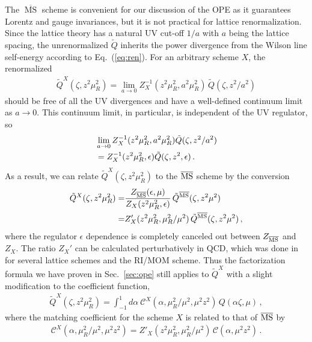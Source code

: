 The $\overline{\ensuremath{\operatorname{MS}}}$ scheme is convenient for our discussion of the OPE as it guarantees Lorentz and gauge invariances, but it is not practical for lattice renormalization. Since the lattice theory has a natural UV cut-off $1/a$ with $a$ being the lattice spacing, the unrenormalized \spcorr $\tilde{Q}$ inherits the power divergence from the Wilson line self-energy according to Eq.~(\ref{eq:ren}). For an arbitrary scheme $X$, the renormalized \spcorr
\begin{align}
\tilde{Q}^X(\zeta,z^2\mu^2_R)
  = \lim_{a\to0} Z^{-1}_X(z^2\mu_R^2,a^2\mu^2_R)\, \tilde{Q}(\zeta,z^2/a^2)
\end{align}
should be free of all the UV divergences and have a well-defined continuum limit as $a\to0$. This continuum limit, in particular, is independent of the UV regulator, so
\begin{align}
&\lim_{a\to0} Z^{-1}_X(z^2\mu_R^2,a^2\mu^2_R)\tilde{Q}(\zeta,z^2/a^2) \nonumber\\
&= Z^{-1}_X(z^2\mu^2_R,\epsilon)\tilde{Q}(\zeta,z^2,\epsilon)\,.
\end{align}
As a result, we can relate $\tilde{Q}^X(\zeta,z^2\mu^2_R)$ to the $\overline{\rm MS}$ scheme by the conversion
\begin{align}
\tilde{Q}^X(\zeta,z^2\mu^2_R) =& \frac{Z_{\overline{\rm MS}}(\epsilon,\mu)}{Z_X(z^2\mu^2_R,\epsilon)}\, \tilde{Q}^{\overline{\rm MS}}(\zeta,z^2\mu^2)\nonumber\\
=& Z'_X(z^2\mu_R^2,\mu_R^2/\mu^2)\, \tilde{Q}^{\overline{\rm MS}}(\zeta,z^2\mu^2)\,,
\end{align}
where the regulator $\epsilon$ dependence is completely canceled out between $Z_{\overline{\rm MS}}$ and $Z_X$. The ratio $Z_X'$ can be calculated perturbatively in QCD, which was done in~\cite{Constantinou:2017sej} for several lattice schemes and the RI/MOM scheme. Thus the factorization formula we have proven in Sec.~\ref{sec:ope} still applies to $\tilde{Q}^X$ with a slight modification to the coefficient function,
\begin{align}
\tilde{Q}^X(\zeta,z^2\mu^2_R)
 = \int_{-1}^1 \!\! d\alpha \
   \mathcal{C}^X(\alpha,\mu_R^2/\mu^2,\mu^2 z^2)\, Q(\alpha\zeta,\mu)\,,
\end{align}
where the matching coefficient for the scheme $X$ is related to that of $\overline{\rm MS}$ by
\begin{align}
\mathcal{C}^X(\alpha,\mu_R^2/\mu^2,\mu^2 z^2) = Z'_X(z^2\mu_R^2,\mu_R^2/\mu^2)\, \mathcal{C}(\alpha,\mu^2 z^2) \,.
\end{align}
